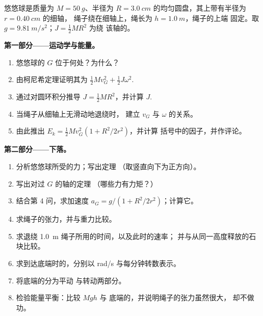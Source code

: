 \begin{problem}
\label{pb:b1:systems-of-points:1}
悠悠球是质量为 $M = \qty{50}{g}$、半径为 $R =
\qty{3.0}{cm}$ 的均匀圆盘，其上带有半径为 $r = \qty{0.40}{cm}$ 的细轴，
绳子绕在细轴上，绳长为 $h = \qty{1.0}{m}$，绳子的上端
固定。取 $g = \qty{9.81}{m/s^2}$；$J = \tfrac12 MR^2$ 为绕
该轴的。

\medskip
\noindent\textbf{第一部分——运动学与能量。}
\begin{enumerate}
  \item 悠悠球的 $G$ 位于何处？为什么？
  \item 由柯尼希定理证明其为 $\tfrac12
        Mv_G^2 + \tfrac12 J\omega^2$.
  \item 通过对圆环积分推导 $J = \tfrac12 MR^2$，并计算
        $J$.
  \item 当绳子从细轴上无滑动地退绕时，
        建立 $v_G$ 与 $\omega$ 的关系。
  \item 由此推出 $E_k = \tfrac12 Mv_G^2(1 + R^2/2r^2)$，并计算
        括号中的因子，并作评论。
\end{enumerate}

\medskip
\noindent\textbf{第二部分——下落。}
\begin{enumerate}[resume]
  \item 分析悠悠球所受的力；写出定理
        （取竖直向下为正方向）。
  \item 写出对过 $G$ 的轴的定理
        （哪些力有力矩？）
  \item 结合第 4 问，求加速度 $a_G = g/(1 +
        R^2/2r^2)$；计算它。
  \item 求绳子的张力，并与重力比较。
  \item 求退绕 \qty{1.0}{m} 绳子所用的时间，以及此时的速率；
        并与从同一高度释放的石块比较。
  \item 求到达底端时的，分别以 rad/s 与每分钟转数表示。
  \item 将底端的分为平动
        与转动两部分。
  \item 检验能量平衡：比较 $Mgh$ 与
        底端的，并说明绳子的张力虽然很大，
        却不做功。
\end{enumerate}


\end{problem}
